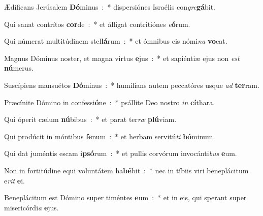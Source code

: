 ﻿\item Ædíficans Jerúsalem \textbf{Dó}minus~:~* dispersiónes Israélis con\emph{gre}\textbf{gá}bit.
\item Qui sanat contrítos \textbf{cor}de~:~* et álligat contritiónes \emph{e}\textbf{ó}rum.
\item Qui númerat multitúdinem stel\textbf{lá}rum~:~* et ómnibus eis nómi\emph{na} \textbf{vo}cat.
\item Magnus Dóminus noster, et magna virtus \textbf{e}jus~:~* et sapiéntiæ ejus non \emph{est} \textbf{nú}merus.
\item Suscípiens mansuétos \textbf{Dó}minus~:~* humílians autem peccatóres usque \emph{ad} \textbf{ter}ram.
\item Præcínite Dómino in confessi\textbf{ó}ne~:~* psállite Deo nostro \emph{in} \textbf{cí}thara.
\item Qui óperit cælum \textbf{nú}bibus~:~* et parat ter\emph{ræ} \textbf{plú}viam.
\item Qui prodúcit in móntibus \textbf{fe}num~:~* et herbam servitú\emph{ti} \textbf{hó}minum.
\item Qui dat juméntis escam i\textbf{psó}rum~:~* et pullis corvórum invocánti\emph{bus} \textbf{e}um.
\item Non in fortitúdine equi voluntátem ha\textbf{bé}bit~:~* nec in tíbiis viri beneplácitum e\emph{rit} \textbf{e}i.
\item Beneplácitum est Dómino super timéntes \textbf{e}um~:~* et in eis, qui sperant super misericórdi\emph{a} \textbf{e}jus.